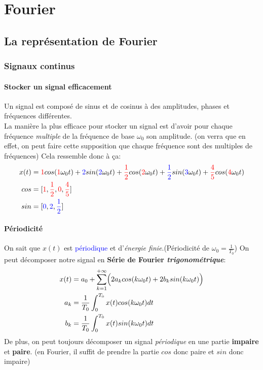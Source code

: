 \documentclass{report}
\begin{document}
\chapter{Fourier}
\section{La représentation de Fourier}

\subsection{Signaux continus}
\subsubsection{Stocker un signal efficacement}
Un signal est composé de sinus et de cosinus à des amplitudes, phases et fréquences différentes.\\
La manière la plus efficace pour stocker un signal est d'avoir pour chaque fréquence \textit{multiple} de la fréquence de base $\omega_0$ son amplitude. (on verra que en effet, on peut faire cette supposition que chaque fréquence sont des multiples de fréquences) Cela ressemble donc à ça:
\begin{align}
x(t) &= \textcolor{red}{1}cos(\textcolor{red}{1}\omega_0t) + \textcolor{blue}{2}sin(\textcolor{blue}{2}\omega_0t) + \textcolor{red}{\frac{1}{2}}cos(\textcolor{red}{2}\omega_0t) + \textcolor{blue}{\frac{1}{2}}sin(\textcolor{blue}{3}\omega_0t) +  \textcolor{red}{\frac{4}{5}}cos(\textcolor{red}{4}\omega_0t) \label{eq:signal}\\
cos &= [\textcolor{red}{1}, \textcolor{red}{\frac{1}{2}}, \textcolor{red}{0}, \textcolor{red}{\frac{4}{5}}]\\
sin &= [\textcolor{blue}{0}, \textcolor{blue}{2}, \textcolor{blue}{\frac{1}{2}}]
\end{align}
\subsubsection{Périodicité}
On sait que $x(t)$ est \textcolor{blue}{périodique} et d'\textit{énergie finie}.(Périodicité de $\omega_0 = \frac{1}{T_0}$) On peut décomposer notre signal en \textbf{Série de Fourier \textit{trigonométrique}}:
\begin{align}
x(t) &= a_0 + \sum_{k=1}^{+\infty} \Bigl(2 a_k cos(k\omega_0 t) + 2b_k sin(k \omega_0 t) \Bigl)\\
a_k &= \frac{1}{T_0} \int_0^{T_0} x(t) cos(k\omega_0t)dt\\
b_k &= \frac{1}{T_0} \int_0^{T_0} x(t) sin(k\omega_0t)dt
\end{align}
De plus, on peut toujours décomposer un signal \textit{périodique} en une partie \textbf{impaire} et \textbf{paire}. (en Fourier, il suffit de prendre la partie $cos$ donc paire et $sin$ donc impaire)\\
\end{document}

